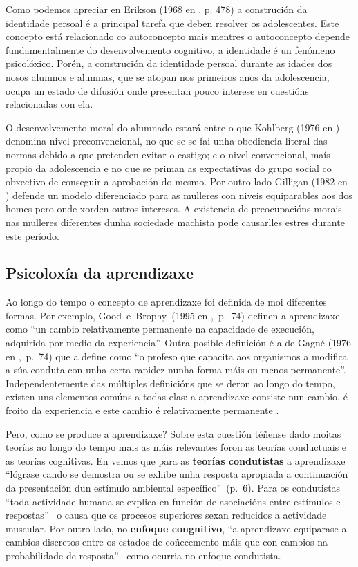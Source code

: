 Como podemos apreciar en Erikson (1968 en , p. 478) a construción da identidade persoal é a principal tarefa que deben resolver os adolescentes. Este concepto está relacionado co autoconcepto mais mentres o autoconcepto depende fundamentalmente do desenvolvemento cognitivo, a identidade é un fenómeno psicolóxico. Porén, a construción da identidade persoal durante as idades dos nosos alumnos e alumnas, que se atopan nos primeiros anos da adolescencia, ocupa un estado de difusión onde presentan pouco interese en cuestións relacionadas con ela.

O desenvolvemento moral do alumnado estará entre o que Kohlberg (1976 en \cite{personalidadcoll}) denomina nivel preconvencional, no que se se fai unha obediencia literal das normas debido a que pretenden evitar o castigo; e o nivel convencional, maís propio da adolescencia e no que se priman as expectativas do grupo social co obxectivo de conseguir a aprobación do mesmo. Por outro lado Gilligan (1982 en \cite{personalidadcoll}) defende un modelo diferenciado para as mulleres con niveis equiparables aos dos homes pero onde xorden outros intereses. A existencia de preocupacións morais nas mulleres diferentes dunha sociedade machista pode causarlles estres durante este período.

\subsection{Psicoloxía da aprendizaxe}
Ao longo do tempo o concepto de aprendizaxe foi definida de moi diferentes formas. Por exemplo, Good~e~Brophy~(1995 en ,~p.~74) definen a aprendizaxe como ``un cambio relativamente permanente na capacidade de execución, adquirida por medio da experiencia''. Outra posible definición é a de Gagné (1976 en ,~p.~74) que a define como ``o profeso que capacita aos organismos a modifica a súa conduta con unha certa rapidez nunha forma máis ou menos permanente''. Independentemente das múltiples definicións que se deron ao longo do tempo, existen uns elementos comúns a todas elas: a aprendizaxe consiste nun cambio, é froito da experiencia e este cambio é relativamente permanente \cite{unedpsicoedu}.

Pero, como se produce a aprendizaxe? Sobre esta cuestión téñense dado moitas teorías ao longo do tempo mais as máis relevantes foron as teorías conductuais e as teorías cognitivas. En  vemos que para as \textbf{teorías condutistas} a aprendizaxe ``lógrase cando se demostra ou se exhibe unha resposta apropiada a continuación da presentación dun estímulo ambiental específico''~(p.~6). Para os condutistas ``toda actividade humana se explica en función de asociacións entre estímulos e respostas''~\cite[p.~82]{unedpsicoedu} o causa que os procesos superiores sexan reducidos a actividade muscular. Por outro lado, no \textbf{enfoque congnitivo}, ``a aprendizaxe equiparase a cambios discretos entre os estados de coñecemento máis que con cambios na probabilidade de resposta''~\cite[p.~9]{ertmer1993conductismo} como ocurria no enfoque condutista.

